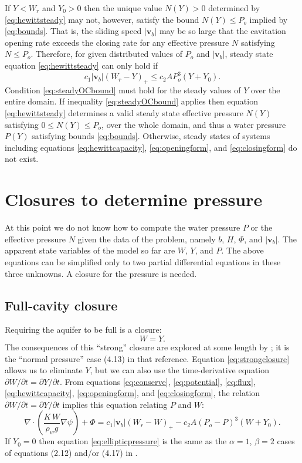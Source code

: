 \documentclass[11pt,final]{amsart}%
\newcommand\bv{\mathbf{v}}
\newcommand{\Div}{\nabla\cdot}
\newcommand{\grad}{\nabla}
\begin{document}
If $Y<W_r$ and $Y_0>0$ then the unique value $N(Y)>0$ determined by \eqref{eq:hewittsteady} may not, however, satisfy the bound $N(Y) \le P_o$ implied by \eqref{eq:bounds}.  That is, the sliding speed $|\bv_b|$ may be so large that the cavitation opening rate exceeds the closing rate for any effective pressure $N$ satisfying $N\le P_o$.  Therefore, for given distributed values of $P_o$ and $|\bv_b|$, steady state equation \eqref{eq:hewittsteady} can only hold if
\begin{equation}
c_1 |\bv_b| (W_r - Y)_+ \le c_2 A P_o^3 (Y+Y_0). \label{eq:steadyOCbound}
\end{equation}
Condition \eqref{eq:steadyOCbound} must hold for the steady values of $Y$ over the entire domain.  If inequality \eqref{eq:steadyOCbound} applies then equation \eqref{eq:hewittsteady} determines a valid steady state effective pressure $N(Y)$ satisfying $0\le N(Y) \le P_o$, over the whole domain, and thus a water pressure $P(Y)$ satisfying bounds \eqref{eq:bounds}.  Otherwise, steady states of systems including equations \eqref{eq:hewittcapacity}, \eqref{eq:openingform}, and \eqref{eq:closingform} do not exist.


\section{Closures to determine pressure} \label{sec:closures}

At this point we do not know how to compute the water pressure $P$ or the effective pressure $N$ given the data of the problem, namely $b$, $H$, $\Phi$, and $|\bv_b|$.  The apparent state variables of the model so far are $W$, $Y$, and $P$.  The above equations can be simplified only to two partial differential equations in these three unknowns.   A closure for the pressure is needed.

\subsection*{Full-cavity closure}  Requiring the aquifer to be full is a closure:
\begin{equation}
W = Y.\label{eq:strongclosure}
\end{equation}
The consequences of this ``strong'' closure are explored at some length by \cite{Schoofetal2012}; it is the ``normal pressure'' case (4.13) in that reference.  Equation \eqref{eq:strongclosure} allows us to eliminate $Y$, but we can also use the time-derivative equation $\partial W/\partial t = \partial Y/\partial t$.  From equations \eqref{eq:conserve}, \eqref{eq:potential}, \eqref{eq:flux}, \eqref{eq:hewittcapacity}, \eqref{eq:openingform}, and \eqref{eq:closingform}, the relation $\partial W/\partial t = \partial Y/\partial t$ implies this equation relating $P$ and $W$:
\begin{equation}
\Div \left(\frac{K\,W}{\rho_w g} \grad \psi \right) + \Phi = c_1 |\bv_b| (W_r - W)_+ - c_2 A (P_o - P)^3 (W+Y_0).\label{eq:ellipticpressure}
\end{equation}
If $Y_0=0$ then equation \eqref{eq:ellipticpressure} is the same as the $\alpha=1$, $\beta=2$ cases of equations (2.12) and/or (4.17) in \citep{Schoofetal2012}.
\end{document}
